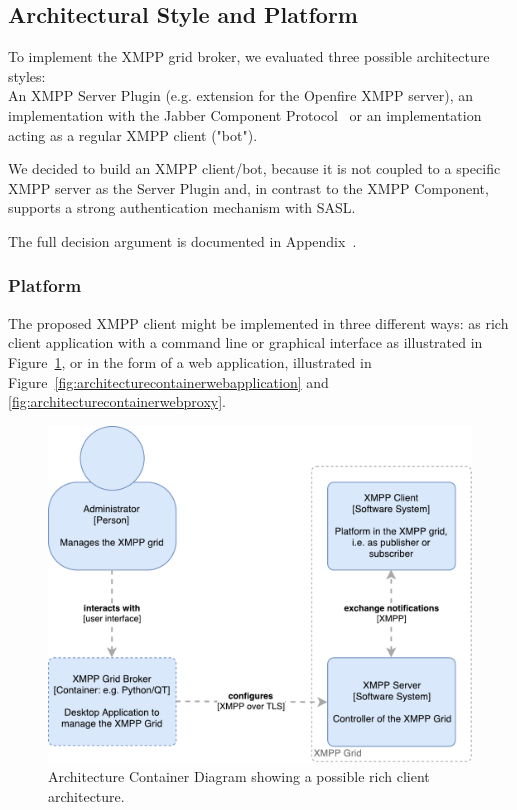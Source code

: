 \subsection{Architectural Style and Platform}

To implement the XMPP grid broker, we evaluated three possible architecture styles:\hfill\\
An XMPP Server Plugin (e.g. extension for the Openfire XMPP server), an implementation with the Jabber Component Protocol~\cite{xep-0114} or an implementation acting as a regular XMPP client ("bot").

We decided to build an XMPP client/bot, because it is not coupled to a specific XMPP server as the Server Plugin and, in contrast to the XMPP Component, supports a strong authentication mechanism with SASL.

The full decision argument is documented in Appendix~.

\subsubsection{Platform}

The proposed XMPP client might be implemented in three different ways: as rich client application with a command line or graphical interface as illustrated in Figure~\ref{fig:architecturecontainerrichclient}, or in the form of a web application, illustrated in Figure~\ref{fig:architecturecontainerwebapplication} and \ref{fig:architecturecontainerwebproxy}.

\begin{figure}[h]
\centering
\includegraphics[width=0.7\linewidth]{resources/architecture_container_rich_client}
\caption[Architecture Container Diagram: Rich Client]{Architecture Container Diagram showing a possible rich client architecture.}
\label{fig:architecturecontainerrichclient}
\end{figure}

